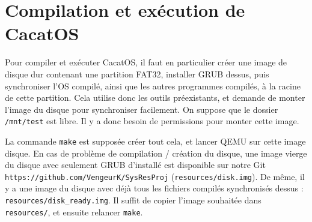 \documentclass[a4paper,10pt, french]{article}
\newcommand{\code}[1]{\texttt{#1}}
\begin{document}
\section{Compilation et exécution de CacatOS}
Pour compiler et exécuter CacatOS, il faut en particulier créer une image de disque dur contenant une partition FAT32,
installer GRUB dessus, puis synchroniser l'OS compilé, ainsi que les autres programmes compilés, à la racine de
cette partition.
Cela utilise donc les outils préexistants, et demande de monter l'image du disque pour synchroniser facilement.
On suppose que le dossier \code{/mnt/test} est libre.
Il y a donc besoin de permissions pour monter cette image.

La commande \code{make} est supposée créer tout cela, et lancer QEMU sur cette image disque.
En cas de problème de compilation / création du disque, une image vierge du disque avec seulement GRUB d'installé
est disponible sur notre Git \code{https://github.com/VengeurK/SysResProj} (\code{resources/disk.img}). De même, il y a une image du disque avec déjà tous les fichiers compilés
synchronisés dessus : \code{resources/disk\_ready.img}.
Il suffit de copier l'image souhaitée dans \code{resources/}, et ensuite relancer \code{make}.
\end{document}
